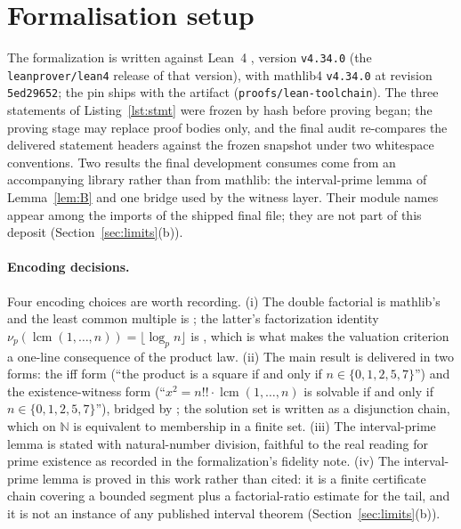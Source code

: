 \documentclass[11pt]{article}
\theoremstyle{definition}
\begin{document}
\section{Formalisation setup}\label{sec:setup}

The formalization is written against Lean~4 \cite{lean4}, version
\texttt{v4.34.0} (the \texttt{leanprover/lean4} release of that version),
with mathlib4 \cite{mathlib} \texttt{v4.34.0} at revision \texttt{5ed29652};
the pin ships with the artifact (\texttt{proofs/lean-toolchain}). The three
statements of Listing~\ref{lst:stmt} were frozen by hash before proving
began; the proving stage may replace proof bodies only, and the final audit
re-compares the delivered statement headers against the frozen snapshot under
two whitespace conventions. Two results the final development consumes come
from an accompanying library rather than from mathlib: the interval-prime lemma
of Lemma~\ref{lem:B} and one bridge used by the witness layer. Their module
names appear among the imports of the shipped final file; they are not part of
this deposit (Section~\ref{sec:limits}(b)).

\paragraph{Encoding decisions.} Four encoding choices are worth recording.
(i) The double factorial is mathlib's  and the
least common multiple is ; the latter's factorization
identity $\nu_p(\operatorname{lcm}(1,\dots,n)) = \lfloor \log_p n \rfloor$ is
, which is what makes the valuation criterion
a one-line consequence of the product law. (ii) The main result is delivered
in two forms: the iff form  (``the product
is a square if and only if $n \in \{0,1,2,5,7\}$'') and the
existence-witness form  (``$x^2 = n!! \cdot
\operatorname{lcm}(1,\dots,n)$ is solvable if and only if $n \in
\{0,1,2,5,7\}$''), bridged by ; the solution set
is written as a disjunction chain, which on $\mathbb{N}$ is equivalent to
membership in a finite set. (iii) The interval-prime lemma is stated with
natural-number division, faithful to the real reading for prime existence as
recorded in the formalization's fidelity note. (iv) The interval-prime lemma
is proved in this work rather than cited: it is a finite certificate chain
covering a bounded segment plus a factorial-ratio estimate for the tail, and
it is not an instance of any published interval theorem
(Section~\ref{sec:limits}(b)).
\end{document}
